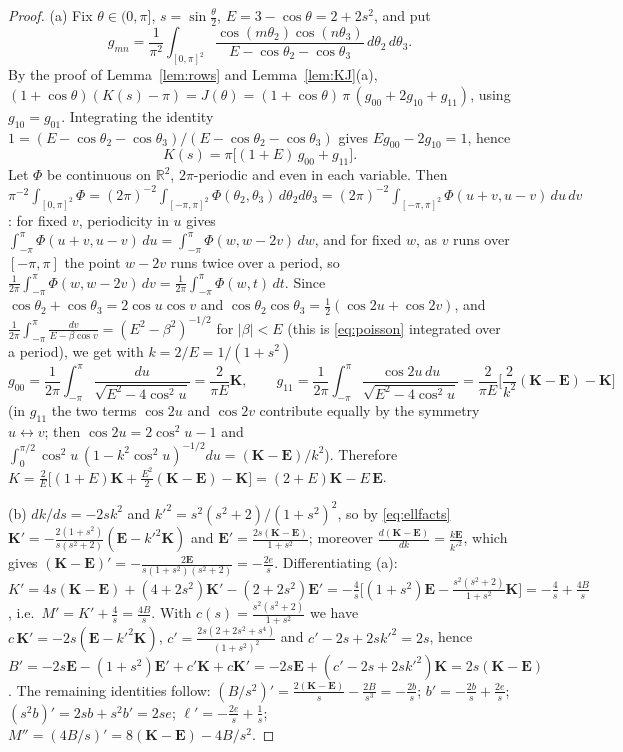 \documentclass[11pt,a4paper]{article}
\newcommand{\R}{\mathbb R}
\theoremstyle{plain}
\theoremstyle{definition}
\numberwithin{equation}{section}
\begin{document}
\begin{proof}
(a) Fix $\theta\in(0,\pi]$, $s=\sin\frac\theta2$, $E=3-\cos\theta=2+2s^2$, and put
\[
g_{mn}=\frac1{\pi^{2}}\int_{[0,\pi]^2}\frac{\cos(m\theta_2)\cos(n\theta_3)}{E-\cos\theta_2-\cos\theta_3}\,d\theta_2\,d\theta_3 .
\]
By the proof of Lemma~\ref{lem:rows} and Lemma~\ref{lem:KJ}(a), $(1+\cos\theta)(K(s)-\pi)=J(\theta)=(1+\cos\theta)\,\pi\,(g_{00}+2g_{10}+g_{11})$, using $g_{10}=g_{01}$. Integrating the identity $1=(E-\cos\theta_2-\cos\theta_3)/(E-\cos\theta_2-\cos\theta_3)$ gives $Eg_{00}-2g_{10}=1$, hence
\[
K(s)=\pi\big[(1+E)\,g_{00}+g_{11}\big].
\]
Let $\Phi$ be continuous on $\R^2$, $2\pi$-periodic and even in each variable. Then $\pi^{-2}\int_{[0,\pi]^2}\Phi=(2\pi)^{-2}\int_{[-\pi,\pi]^2}\Phi(\theta_2,\theta_3)\,d\theta_2d\theta_3=(2\pi)^{-2}\int_{[-\pi,\pi]^2}\Phi(u+v,u-v)\,du\,dv$: for fixed $v$, periodicity in $u$ gives $\int_{-\pi}^{\pi}\Phi(u+v,u-v)\,du=\int_{-\pi}^{\pi}\Phi(w,w-2v)\,dw$, and for fixed $w$, as $v$ runs over $[-\pi,\pi]$ the point $w-2v$ runs twice over a period, so $\frac1{2\pi}\int_{-\pi}^{\pi}\Phi(w,w-2v)\,dv=\frac1{2\pi}\int_{-\pi}^{\pi}\Phi(w,t)\,dt$. Since $\cos\theta_2+\cos\theta_3=2\cos u\cos v$ and $\cos\theta_2\cos\theta_3=\frac12(\cos2u+\cos2v)$, and $\frac1{2\pi}\int_{-\pi}^{\pi}\frac{dv}{E-\beta\cos v}=(E^2-\beta^2)^{-1/2}$ for $|\beta|<E$ (this is \eqref{eq:poisson} integrated over a period), we get with $k=2/E=1/(1+s^2)$
\[
g_{00}=\frac1{2\pi}\int_{-\pi}^{\pi}\frac{du}{\sqrt{E^2-4\cos^2u}}=\frac{2}{\pi E}\mathbf K,\qquad
g_{11}=\frac1{2\pi}\int_{-\pi}^{\pi}\frac{\cos2u\,du}{\sqrt{E^2-4\cos^2u}}=\frac{2}{\pi E}\Big[\frac{2}{k^2}(\mathbf K-\mathbf E)-\mathbf K\Big]
\]
(in $g_{11}$ the two terms $\cos2u$ and $\cos2v$ contribute equally by the symmetry $u\leftrightarrow v$; then $\cos2u=2\cos^2u-1$ and $\int_0^{\pi/2}\cos^2u\,(1-k^2\cos^2u)^{-1/2}du=(\mathbf K-\mathbf E)/k^2$). Therefore $K=\frac2E\big[(1+E)\mathbf K+\frac{E^2}{2}(\mathbf K-\mathbf E)-\mathbf K\big]=(2+E)\mathbf K-E\,\mathbf E$.

(b) $dk/ds=-2sk^2$ and $k'^2=s^2(s^2+2)/(1+s^2)^2$, so by \eqref{eq:ellfacts}
$\mathbf K'=-\frac{2(1+s^2)}{s(s^2+2)}(\mathbf E-k'^2\mathbf K)$ and $\mathbf E'=\frac{2s(\mathbf K-\mathbf E)}{1+s^2}$; moreover $\frac{d(\mathbf K-\mathbf E)}{dk}=\frac{k\mathbf E}{k'^2}$, which gives $(\mathbf K-\mathbf E)'=-\frac{2\mathbf E}{s(1+s^2)(s^2+2)}=-\frac{2e}s$. Differentiating (a):
$K'=4s(\mathbf K-\mathbf E)+(4+2s^2)\mathbf K'-(2+2s^2)\mathbf E'=-\frac4s\big[(1+s^2)\mathbf E-\frac{s^2(s^2+2)}{1+s^2}\mathbf K\big]=-\frac4s+\frac{4B}s$, i.e.\ $M'=K'+\frac4s=\frac{4B}{s}$. With $c(s)=\frac{s^2(s^2+2)}{1+s^2}$ we have $c\,\mathbf K'=-2s(\mathbf E-k'^2\mathbf K)$, $c'=\frac{2s(2+2s^2+s^4)}{(1+s^2)^2}$ and $c'-2s+2sk'^2=2s$, hence
$B'=-2s\mathbf E-(1+s^2)\mathbf E'+c'\mathbf K+c\mathbf K'=-2s\mathbf E+(c'-2s+2sk'^2)\mathbf K=2s(\mathbf K-\mathbf E)$.
The remaining identities follow: $(B/s^2)'=\frac{2(\mathbf K-\mathbf E)}{s}-\frac{2B}{s^3}=-\frac{2b}s$; $b'=-\frac{2b}{s}+\frac{2e}{s}$; $(s^2b)'=2sb+s^2b'=2se$; $\ell'=-\frac{2e}s+\frac1s$; $M''=(4B/s)'=8(\mathbf K-\mathbf E)-4B/s^2$.


\end{proof}
\end{document}
